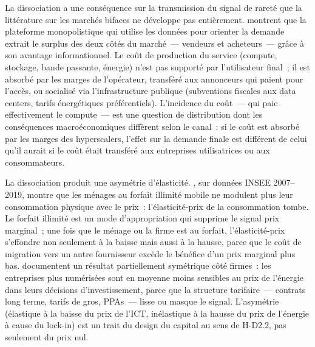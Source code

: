 La dissociation a une conséquence sur la transmission du signal de rareté que la littérature sur les marchés bifaces ne développe pas entièrement. \textcite{bergemann_bonatti_2024} montrent que la plateforme monopolistique qui utilise les données pour orienter la demande extrait le surplus des deux côtés du marché~--- vendeurs et acheteurs~--- grâce à son avantage informationnel. Le coût de production du service (compute, stockage, bande passante, énergie) n'est pas supporté par l'utilisateur final~; il est absorbé par les marges de l'opérateur, transféré aux annonceurs qui paient pour l'accès, ou socialisé via l'infrastructure publique (subventions fiscales aux data centers, tarifs énergétiques préférentiels). L'incidence du coût~--- qui paie effectivement le compute~--- est une question de distribution dont les conséquences macroéconomiques diffèrent selon le canal~: si le coût est absorbé par les marges des hyperscalers, l'effet sur la demande finale est différent de celui qu'il aurait si le coût était transféré aux entreprises utilisatrices ou aux consommateurs.

La dissociation produit une asymétrie d'élasticité. \textcite{aubouin_economie_2023}, sur données INSEE 2007--2019, montre que les ménages au forfait illimité mobile ne modulent plus leur consommation physique avec le prix~: l'élasticité-prix de la consommation tombe. Le forfait illimité est un mode d'appropriation qui supprime le signal prix marginal~; une fois que le ménage ou la firme est au forfait, l'élasticité-prix s'effondre non seulement à la baisse mais aussi à la hausse, parce que le coût de migration vers un autre fournisseur excède le bénéfice d'un prix marginal plus bas. \textcite{axenbeck_what_2022} documentent un résultat partiellement symétrique côté firmes~: les entreprises plus numérisées sont en moyenne moins sensibles au prix de l'énergie dans leurs décisions d'investissement, parce que la structure tarifaire~--- contrats long terme, tarifs de gros, PPAs~--- lisse ou masque le signal. L'asymétrie (élastique à la baisse du prix de l'ICT, inélastique à la hausse du prix de l'énergie à cause du lock-in) est un trait du design du capital au sens de H-D2.2, pas seulement du prix nul.


